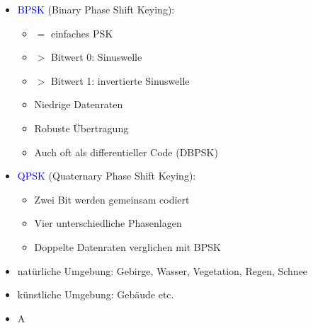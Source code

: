 \begin{itemize}
    \item \textcolor{blue}{BPSK} (Binary Phase Shift Keying):
    \begin{itemize}
        \item $=$ einfaches PSK
        \item $>$ Bitwert 0: Sinuswelle
        \item $>$ Bitwert 1: invertierte Sinuswelle
        \item Niedrige Datenraten
        \item Robuste Übertragung
        \item Auch oft als differentieller Code (DBPSK)
    \end{itemize}
    \item \textcolor{blue}{QPSK} (Quaternary Phase Shift Keying):
    \begin{itemize}
        \item Zwei Bit werden gemeinsam codiert
        \item Vier unterschiedliche Phasenlagen
        \item Doppelte Datenraten verglichen mit BPSK
    \end{itemize}
\end{itemize}

\begin{itemize}
    \item natürliche Umgebung: Gebirge, Wasser, Vegetation, Regen, Schnee
    \item künstliche Umgebung: Gebäude etc.
\end{itemize}

\begin{itemize}
    \item \todo A
\end{itemize}

